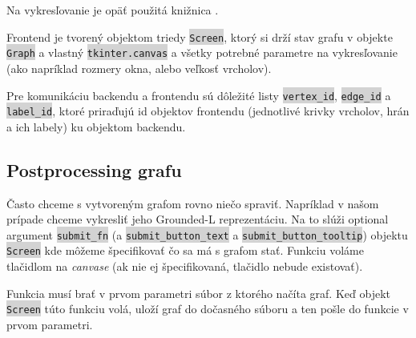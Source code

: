 \documentclass{article}
\newcommand{\code}[1]{\colorbox{lightgray}{\lstinline{#1}}}
\begin{document}
Na vykresľovanie je opäť použitá knižnica .

Frontend je tvorený objektom triedy \code{Screen}, ktorý si drží stav grafu v objekte \code{Graph} a vlastný \code{tkinter.canvas} a všetky potrebné parametre na vykresľovanie (ako napríklad rozmery okna, alebo veľkosť vrcholov).

Pre komunikáciu backendu a frontendu sú dôležité listy \code{vertex_id}, \code{edge_id} a \code{label_id}, ktoré priraďujú id objektov frontendu (jednotlivé krivky vrcholov, hrán a ich labely) ku objektom backendu.

\subsection{Postprocessing grafu}

Často chceme s vytvoreným grafom rovno niečo spraviť. Napríklad v našom prípade chceme vykresliť jeho Grounded-L reprezentáciu. Na to slúži optional argument \code{submit_fn} (a \code{submit_button_text} a \code{submit_button_tooltip}) objektu \code{Screen} kde môžeme špecifikovať čo sa má s grafom stať. Funkciu voláme tlačidlom na \textit{canvase} (ak nie ej špecifikovaná, tlačidlo nebude existovať).

Funkcia musí brať v prvom parametri súbor z ktorého načíta graf. Keď objekt \code{Screen} túto funkciu volá, uloží graf do dočasného súboru a ten pošle do funkcie v prvom parametri.
\end{document}
